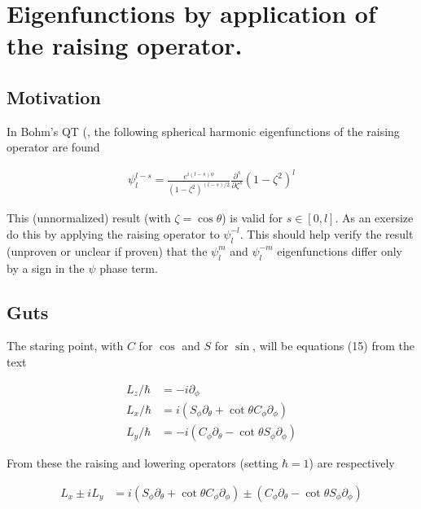 

\chapter{Eigenfunctions by application of the raising operator.}
\label{chap:sphericalHarmonicRaising}
{}
\date{Aug 18, 2009}

\beginArtNoToc

\section{Motivation}

In Bohm's QT (\cite{bohm1989qt}, the following spherical harmonic eigenfunctions of the raising operator are found

\begin{align}\label{eqn:foo0}
\psi_l^{l-s} = \frac{e^{i(l-s)\phi}}{(1-\zeta^2)^{(l-s)/2}} \frac{\partial^s}{\partial \zeta^s} (1-\zeta^2)^l
\end{align}

This (unnormalized) result (with $\zeta = \cos\theta$) is valid for $s \in [0,l]$.  As an exersize do this by applying the raising operator to $\psi_l^{-l}$.  This should help verify the result (unproven or unclear if proven) that the $\psi_l^m$ and $\psi_l^{-m}$ eigenfunctions differ only by a sign in the $\psi$ phase term.

\section{Guts}

The staring point, with $C$ for $\cos$ and $S$ for $\sin$, will be equations (15) from the text

\begin{align*}
L_z/\hbar &= -i \partial_\phi \\
L_x/\hbar &= i (S_\phi \partial_\theta + \cot\theta C_\phi \partial_\phi) \\
L_y/\hbar &= -i (C_\phi \partial_\theta - \cot\theta S_\phi \partial_\phi)
\end{align*}

From these the raising and lowering operators (setting $\hbar=1$) are respectively

\begin{align*}
L_x \pm iL_y &= 
i (S_\phi \partial_\theta + \cot\theta C_\phi \partial_\phi)
\pm (C_\phi \partial_\theta - \cot\theta S_\phi \partial_\phi)
\end{align*}

\EndArticle
